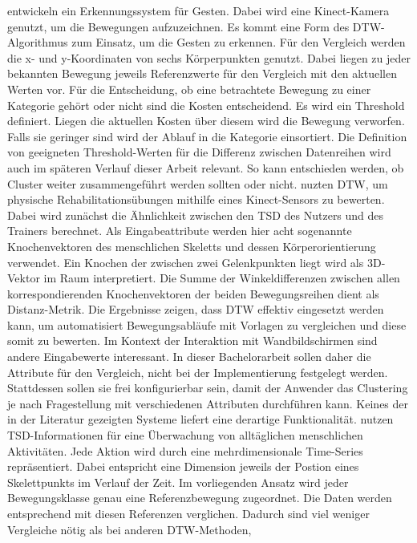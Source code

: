 \citet{wahyuni_motion_2021} entwickeln ein Erkennungssystem für Gesten.
Dabei wird eine Kinect-Kamera genutzt, um die Bewegungen aufzuzeichnen.
Es kommt eine Form des \ac{DTW}-Algorithmus zum Einsatz, um die Gesten zu erkennen.
Für den Vergleich werden die x- und y-Koordinaten von sechs Körperpunkten genutzt.
Dabei liegen zu jeder bekannten Bewegung jeweils Referenzwerte für den Vergleich mit den aktuellen Werten vor.
Für die Entscheidung, ob eine betrachtete Bewegung zu einer Kategorie gehört oder nicht sind die Kosten entscheidend.
Es wird ein Threshold definiert.
Liegen die aktuellen Kosten über diesem wird die Bewegung verworfen.
Falls sie geringer sind wird der Ablauf in die Kategorie einsortiert.
Die Definition von geeigneten Threshold-Werten für die Differenz zwischen Datenreihen
wird auch im späteren Verlauf dieser Arbeit relevant.
So kann entschieden werden, ob Cluster weiter zusammengeführt werden sollten oder nicht.
\citet{yu_dynamic_2019} nuzten \ac{DTW}, um physische Rehabilitationsübungen mithilfe eines Kinect-Sensors zu bewerten.
Dabei wird zunächst die Ähnlichkeit zwischen den \ac{TSD} des Nutzers und des Trainers berechnet.
Als Eingabeattribute werden hier acht sogenannte Knochenvektoren des menschlichen Skeletts und dessen Körperorientierung verwendet.
Ein Knochen der zwischen zwei Gelenkpunkten liegt wird als 3D-Vektor im Raum interpretiert.
Die Summe der Winkeldifferenzen zwischen allen korrespondierenden Knochenvektoren der beiden Bewegungsreihen dient
als Distanz-Metrik.
Die Ergebnisse zeigen, dass \ac{DTW} effektiv eingesetzt werden kann,
um automatisiert Bewegungsabläufe mit Vorlagen zu vergleichen und diese somit zu bewerten.
Im Kontext der Interaktion mit Wandbildschirmen sind andere Eingabewerte interessant.
In dieser Bachelorarbeit sollen daher die Attribute für den Vergleich,
nicht bei der Implementierung festgelegt werden.
Stattdessen sollen sie frei konfigurierbar sein,
damit der Anwender das Clustering je nach Fragestellung mit verschiedenen Attributen durchführen kann.
Keines der in der Literatur gezeigten Systeme liefert eine derartige Funktionalität.
\citet{mohammadzade_dynamic_2021} nutzen \ac{TSD}-Informationen für eine Überwachung von alltäglichen menschlichen Aktivitäten.
Jede Aktion wird durch eine mehrdimensionale Time-Series repräsentiert.
Dabei entspricht eine Dimension jeweils der Postion eines Skelettpunkts im Verlauf der Zeit.
Im vorliegenden Ansatz wird jeder Bewegungsklasse genau eine Referenzbewegung zugeordnet.
Die Daten werden entsprechend mit diesen Referenzen verglichen.
Dadurch sind viel weniger Vergleiche nötig als bei anderen \ac{DTW}-Methoden,
